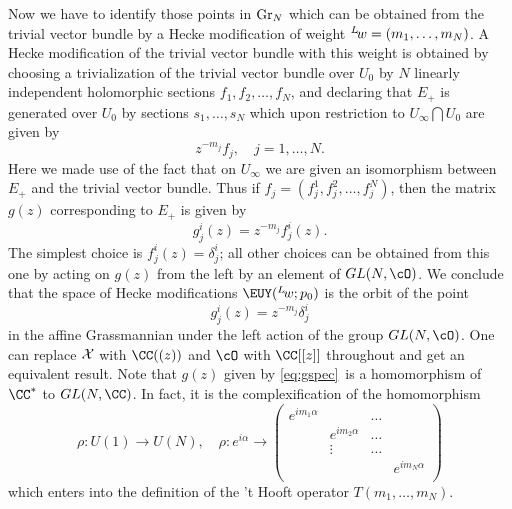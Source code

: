 Now we have to identify those points in ${\rm Gr}_N$ which can be
obtained from the trivial vector bundle by a Hecke modification of
weight $^L\negthinspace w=(m_1,\ldots,m_N)$. A Hecke modification
of the trivial vector bundle with this weight is obtained by
choosing a trivialization of the trivial vector bundle over $U_0$
by $N$ linearly independent holomorphic sections $f_1,f_2,\dots,
f_N$, and declaring that $E_+$ is generated over $U_0$ by sections
$s_1,\ldots,s_N$ which upon restriction to $U_\infty\bigcap U_0$
are given by %
\setcounter{equation}{28}
\begin{equation}\label{eq:mcop}
z^{-m_j} f_j,\quad j=1,\ldots,N.
\end{equation}
 Here we
made use of the fact that on $U_\infty$ we are given an
isomorphism between $E_+$ and the trivial vector bundle. Thus if
$f_j=(f_j^1,f_j^2,\dots,f_j^N)$, then the matrix $g(z)$
corresponding to $E_+$ is given by %
\setcounter{equation}{29}
\begin{equation}\label{eq:xcoxo}
g^i_j(z)=z^{-m_j}
f^i_j(z).
\end{equation}
 The simplest choice is $f^i_j(z)=\delta^i_j$; all
other choices can be obtained from this one by acting on $g(z)$
from the left by an element of $GL(N,\cO)$. We conclude that the
space of Hecke modifications ${{\EUY}}({}^L\negthinspace w;p_0)$
is the orbit of the point %
\setcounter{equation}{30}
\begin{equation}\label{eq:gspec}
g^i_j(z)=z^{-m_j}
\delta^i_j
\end{equation}
 in the affine Grassmannian under the left action of
the group $GL(N,\cO)$. One can replace ${\cal X}$ with $\CC((z))$
and $\cO$ with $\CC[[z]]$ throughout and get an equivalent result.
Note that $g(z)$ given by \eqref{eq:gspec}\ is a homomorphism of $\CC^*$ to
$GL(N,\CC)$.  In fact, it is the complexification of the
homomorphism %
\setcounter{equation}{31}
\begin{equation}\label{eq:xxconon}
\rho: U(1)\to U(N),\quad \rho:
e^{i\alpha}\to \left(\begin{matrix}e^{i m_1\alpha} & & \ldots & \\ &
e^{i m_2\alpha} & \ldots &  \\  & \vdots & \ldots & \\ & & &
e^{i m_N\alpha}\\\end{matrix}\right)
\end{equation}
 which enters into the definition of
the 't Hooft operator $T(m_1,\ldots,m_N)$.

